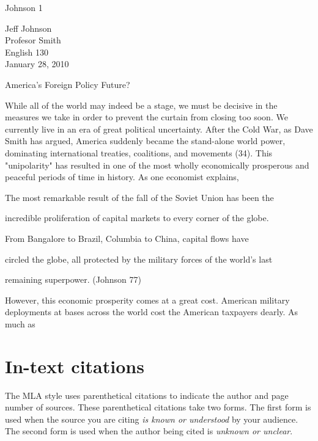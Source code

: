 \newpage

\thispagestyle{empty}
\begin{flushright}Johnson 1\end{flushright}
\bigskip
\begin{Spacing}{2}
Jeff Johnson\\
Profesor Smith\\
English 130\\
January 28, 2010
\end{Spacing}
\begin{center}
America's Foreign Policy Future?
\end{center}
\begin{Spacing}{2}

\hspace{.4in}While all of the world may indeed be a stage, we must be decisive in the 
measures we take in order to prevent the curtain from closing too soon. We currently 
live in an era of great political uncertainty. After the Cold War, as Dave Smith has argued, 
America suddenly became the stand-alone world power, dominating international 
treaties, coalitions, and movements (34). This "unipolarity" has resulted in one of the 
most wholly economically prosperous and peaceful periods of time in history. As one 
economist explains,

\hspace{.8in}The most remarkable result of the fall of the Soviet Union has been the

\hspace{.8in}incredible proliferation of capital markets to every corner of the globe.

\hspace{.8in}From Bangalore to Brazil, Columbia to China, capital flows have  

\hspace{.8in}circled the globe, all protected by the military forces of the world's last 

\hspace{.8in}remaining superpower. (Johnson 77)

However, this economic prosperity comes at a great cost. American military 
deployments at bases across the world cost the American taxpayers dearly. As much as


\end{Spacing}
\newpage

\section{In-text citations}
The MLA style uses parenthetical citations to indicate the author and page number of 
sources. These parenthetical citations take two forms. The first form is used when the 
source you are citing \emph{is known or understood} by your audience. The second 
form is used when the author being cited is \emph{unknown or unclear}. 

